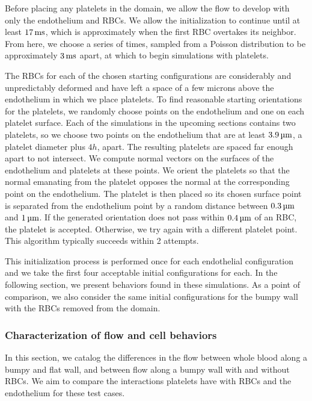 Before placing any platelets in the domain, we allow the flow to develop with only the endothelium and RBCs. We
allow the initialization to continue until at least $17\ms$, which is approximately when the first RBC overtakes
its neighbor. From here, we choose a series of times, sampled from a Poisson distribution to be approximately
$3\ms$ apart, at which to begin simulations with platelets.

The RBCs for each of the chosen starting configurations are considerably and unpredictably deformed and have left
a space of a few microns above the endothelium in which we place platelets. To find reasonable starting
orientations for the platelets, we randomly choose points on the endothelium and one on each platelet surface.
Each of the simulations in the upcoming sections contains two platelets, so we choose two points on the
endothelium that are at least $3.9\um$, a platelet diameter plus $4h$, apart. The resulting platelets are spaced
far enough apart to not intersect. We compute normal vectors on the surfaces of the endothelium and platelets at
these points. We orient the platelets so that the normal emanating from the platelet opposes the normal at the
corresponding point on the endothelium. The platelet is then placed so its chosen surface point is separated from
the endothelium point by a random distance between $0.3\um$ and $1\um$. If the generated orientation does not pass
within $0.4\um$ of an RBC, the platelet is accepted. Otherwise, we try again with a different platelet point. This
algorithm typically succeeds within 2 attempts.

This initialization process is performed once for each endothelial configuration and we take the first four
acceptable initial configurations for each. In the following section, we present behaviors found in these
simulations. As a point of comparison, we also consider the same initial configurations for the bumpy wall with
the RBCs removed from the domain.

\subsubsection{Characterization of flow and cell behaviors}

In this section, we catalog the differences in the flow between whole blood along a bumpy and flat wall, and
between flow along a bumpy wall with and without RBCs. We aim to compare the interactions platelets have with RBCs
and the endothelium for these test cases.


